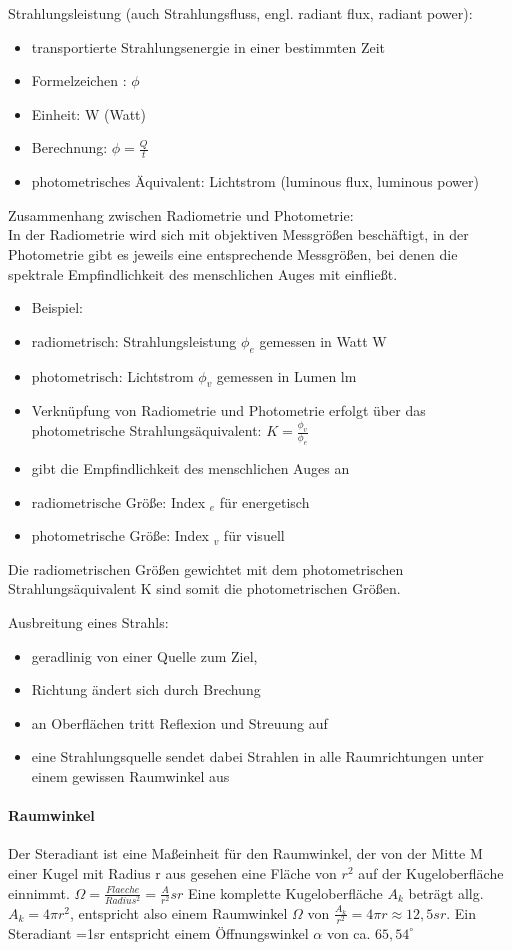 \documentclass[10pt,landscape]{article}
\begin{document}
\begin{multicols}{3}
Strahlungsleistung (auch Strahlungsfluss, engl. radiant flux, radiant power):
\begin{itemize}
  \item transportierte Strahlungsenergie in einer bestimmten Zeit
  \item Formelzeichen : $\phi$
  \item Einheit: W (Watt)
  \item Berechnung: $\phi = \frac{Q}{t}$
  \item photometrisches Äquivalent: Lichtstrom (luminous flux, luminous power)
\end{itemize}

Zusammenhang zwischen Radiometrie und Photometrie:\\
In der Radiometrie wird sich mit objektiven Messgrößen beschäftigt, in der Photometrie gibt es jeweils eine entsprechende Messgrößen, bei denen die spektrale Empfindlichkeit des menschlichen Auges mit einfließt.
\begin{itemize}
  \item Beispiel:
  \item radiometrisch: Strahlungsleistung $\phi_e$ gemessen in Watt W
  \item photometrisch: Lichtstrom $\phi_v$ gemessen in Lumen lm
  \item Verknüpfung von Radiometrie und Photometrie erfolgt über das photometrische Strahlungsäquivalent: $K =\frac{\phi_v}{\phi_e}$
  \item gibt die Empfindlichkeit des menschlichen Auges an
  \item radiometrische Größe: Index $_e$ für energetisch
  \item photometrische Größe: Index $_v$ für visuell
\end{itemize}
Die radiometrischen Größen gewichtet mit dem photometrischen Strahlungsäquivalent K sind somit die photometrischen Größen.

Ausbreitung eines Strahls:
\begin{itemize}
  \item geradlinig von einer Quelle zum Ziel,
  \item Richtung ändert sich durch Brechung
  \item an Oberflächen tritt Reflexion und Streuung auf
  \item eine Strahlungsquelle sendet dabei Strahlen in alle Raumrichtungen unter einem gewissen Raumwinkel aus
\end{itemize}

\paragraph{Raumwinkel}
Der Steradiant ist eine Maßeinheit für den Raumwinkel, der von der Mitte M einer Kugel mit Radius r aus gesehen eine Fläche von $r^2$ auf der Kugeloberfläche einnimmt. $\Omega=\frac{Flaeche}{Radius^2}=\frac{A}{r^2}sr$
Eine komplette Kugeloberfläche $A_k$ beträgt allg. $A_k = 4\pi r^2$, entspricht also einem Raumwinkel $\Omega$ von $\frac{A_k}{r^2}= 4\pi r\approx 12,5sr$. Ein Steradiant =1sr entspricht einem Öffnungswinkel $\alpha$ von ca. $65,54^{\circ}$


\end{multicols}
\end{document}
